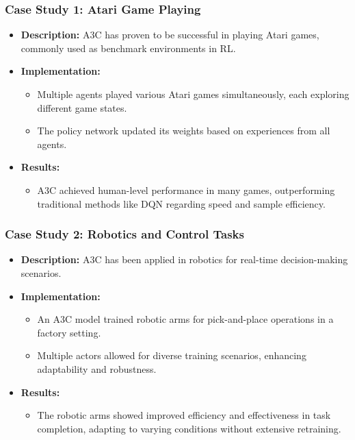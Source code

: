 \documentclass{beamer}
\begin{document}
\begin{frame}[fragile]
    \frametitle{Case Study 1: Atari Game Playing}
    \begin{itemize}
        \item \textbf{Description:} A3C has proven to be successful in playing Atari games, commonly used as benchmark environments in RL.
        \item \textbf{Implementation:}
        \begin{itemize}
            \item Multiple agents played various Atari games simultaneously, each exploring different game states.
            \item The policy network updated its weights based on experiences from all agents.
        \end{itemize}
        \item \textbf{Results:}
        \begin{itemize}
            \item A3C achieved human-level performance in many games, outperforming traditional methods like DQN regarding speed and sample efficiency.
        \end{itemize}
    \end{itemize}
\end{frame}

\begin{frame}[fragile]
    \frametitle{Case Study 2: Robotics and Control Tasks}
    \begin{itemize}
        \item \textbf{Description:} A3C has been applied in robotics for real-time decision-making scenarios.
        \item \textbf{Implementation:}
        \begin{itemize}
            \item An A3C model trained robotic arms for pick-and-place operations in a factory setting.
            \item Multiple actors allowed for diverse training scenarios, enhancing adaptability and robustness.
        \end{itemize}
        \item \textbf{Results:}
        \begin{itemize}
            \item The robotic arms showed improved efficiency and effectiveness in task completion, adapting to varying conditions without extensive retraining.
        \end{itemize}
    \end{itemize}
\end{frame}
\end{document}
